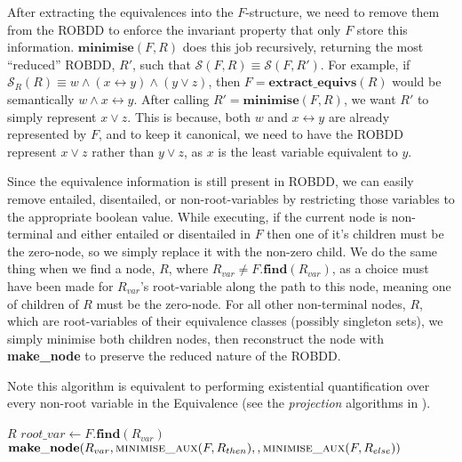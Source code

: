 \documentclass[11pt,table]{article}
\newcounter{r}
\newcommand{\bimv}[2]{#1\leftrightarrow{#2}}
\newcommand{\semR}[1]{\mathcal{S}_R(#1)}
\newcommand{\semFR}[1]{\mathcal{S}(#1)}
\newcommand{\func}[2]{\mathbf{#1}(#2)}
\begin{document}
After extracting the equivalences into the $ F $-structure, we need to remove them from the ROBDD to enforce the invariant property that only $ F $ store this information. $ \func{minimise}{F,R} $ does this job recursively, returning the most ``reduced'' ROBDD, $ R' $, such that $ \semFR{F,R} \equiv \semFR{F,R'}$. For example, if $ \semR{R} \equiv w \wedge (\bimv{x}{y}) \wedge (y \vee z) $, then $ F = \func{extract\_equivs}{R} $ would be semantically $ w \wedge \bimv{x}{y} $. After calling $ R' = \func{minimise}{F,R}  $, we want $ R' $ to simply represent $ x \vee z $. This is because, both $ w $ and $ \bimv{x}{y} $ are already represented by $ F $, and to keep it canonical, we need to have the ROBDD represent $ x \vee z $ rather than $ y \vee z$, as $ x $ is the least variable equivalent to $ y $.

Since the equivalence information is still present in ROBDD, we can easily remove entailed, disentailed, or non-root-variables by restricting those variables to the appropriate boolean value. While executing, if the current node is non-terminal and either entailed or disentailed in $ F $ then one of it's children must be the zero-node, so we simply replace it with the non-zero child. We do the same thing when we find a node, $ R $, where $ R_{var} \neq F.\func{find}{R_{var}}$, as a choice must have been made for $ R_{var} $'s root-variable along the path to this node, meaning one of children of $ R $ must be the zero-node. For all other non-terminal nodes, $ R $, which are root-variables of their equivalence classes (possibly singleton sets), we simply minimise both children nodes, then reconstruct the node with \textbf{make\_node} to preserve the reduced nature of the ROBDD.

Note this algorithm is equivalent to performing existential quantification over every non-root variable in the Equivalence (see the \textit{projection} algorithms in \cite{bag_schachteR}).

\begin{algorithm}
	\begin{algorithmic}[1]
			\Return $ R $
			\Else
				\State $ root\_var \gets F.\func{find}{R_{var}}$
				\State
						\Return {}
					\Else{}
						\Return {}
					\EndIf
					\State
				\Else
					\State \Return $ \func{make\_node}{ R_{var} , \Call{minimise\_aux}{ F,R_{then}}, , \Call{minimise\_aux}{F,R_{else}}} $
				\EndIf
			\EndIf
		\EndFunction
	\end{algorithmic}
\end{algorithm}
\end{document}
